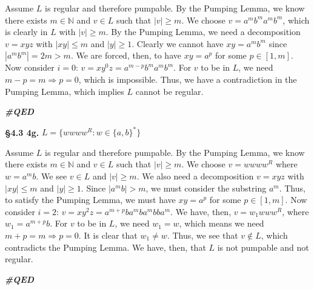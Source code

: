 \documentclass[12pt,letter]{article}
\newcommand{\QED}{
	\begin{flushright}
		\textit{\textbf{\#QED}}
	\end{flushright}
}
\begin{document}
Assume $L$ is regular and therefore pumpable. By the Pumping Lemma, we know there exists $m \in \mathbb{N}$ and $v \in L$ such that $|v| \geq m$. We choose $v = a^m b^m a^m b^m$, which is clearly in $L$ with $|v| \geq m$. By the Pumping Lemma, we need a decomposition $v = xyz$ with $|xy| \leq m$ and $|y| \geq 1$. Clearly we cannot have $xy = a^m b^m$ since $|a^m b^m| = 2m > m$. We are forced, then, to have $xy = a^p$ for some $p \in [1, m]$. Now consider $i = 0$: $v = xy^0 z = a^{m-p} b^m a^m b^m$. For $v$ to be in $L$, we need $m - p = m \Rightarrow p = 0$, which is impossible. Thus, we have a contradiction in the Pumping Lemma, which implies $L$ cannot be regular. \QED

\textbf{\S 4.3 4g.} $L = \{ wwww^R : w \in \{ a,b \}^* \}$

Assume $L$ is regular and therefore pumpable. By the Pumping Lemma, we know there exists $m \in \mathbb{N}$ and $v \in L$ such that $|v| \geq m$. We choose $v = wwww^R$ where $w = a^m b$. We see $v \in L$ and $|v| \geq m$. We also need a decomposition $v = xyz$ with $|xy| \leq m$ and $|y| \geq 1$. Since $|a^m b| > m$, we must consider the substring $a^m$. Thus, to satisfy the Pumping Lemma, we must have $xy = a^p$ for some $p \in [1, m]$. Now consider $i = 2$: $v = xy^2 z = a^{m+p} b a^m b a^m b b a^m$. We have, then, $v = w_1 www^R$, where $w_1 = a^{m+p} b$. For $v$ to be in $L$, we need $w_1 = w$, which means we need $m + p = m \Rightarrow p = 0$. It is clear that $w_1 \neq w$. Thus, we see that $v \not\in L$, which contradicts the Pumping Lemma. We have, then, that $L$ is not pumpable and not regular. \QED
\end{document}
